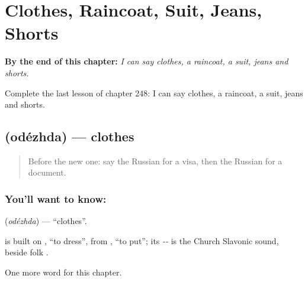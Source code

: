 
\chapter{Clothes, Raincoat, Suit, Jeans, Shorts}
\label{ch:ru-clothes-raincoat-suit-jeans-shorts}

\begin{chapteropening}
\textbf{By the end of this chapter:} \emph{I can say clothes, a raincoat, a suit, jeans and shorts.}

Complete the last lesson of chapter 248: I can say clothes, a raincoat, a suit, jeans and shorts.
\end{chapteropening}

\section[\texorpdfstring{\ru{одежда} (odézhda)}{одежда (odézhda)}]{ (odézhda) — clothes}

\label{lesson:RU-C248-odezhda}



\begin{quote}
Before the new one: say the Russian for a visa, then the Russian for a document.
\end{quote}

\subsection*{You'll want to know: }
\textbf{} (\emph{odézhda}) — \textquotedblleft{}clothes\textquotedblright{}.

\begin{cousinweb}
\textbf{} is built on \emph{}, \textquotedblleft{}to dress\textquotedblright{}, from \emph{}, \textquotedblleft{}to put\textquotedblright{}; its \emph{--} is the Church Slavonic sound, beside folk \emph{}.
\end{cousinweb}

\begin{grammarlens}[title={What you've built}]
One more word for this chapter.
\end{grammarlens}

